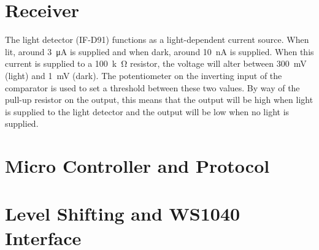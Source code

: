 \section{Receiver}
The light detector (IF-D91) functions as a light-dependent current source. When lit, around \SI{3}{\micro\ampere} is supplied and when dark, around \SI{10}{nA} is supplied. When this current is supplied to a \SI{100}{k\ohm} resistor, the voltage will alter between \SI{300}{mV} (light) and \SI{1}{mV} (dark). The potentiometer on the inverting input of the comparator is used to set a threshold between these two values. By way of the pull-up resistor on the output, this means that the output will be high when light is supplied to the light detector and the output will be low when no light is supplied.

\section{Micro Controller and Protocol}

\section{Level Shifting and WS1040 Interface}
